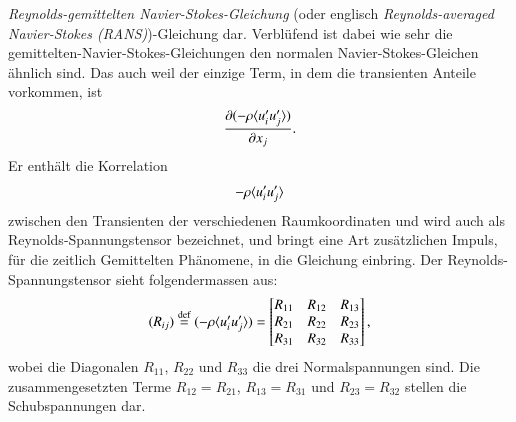 \emph{Reynolds-gemittelten Navier-Stokes-Gleichung} (oder englisch \emph{Reynolds-averaged
Navier-Stokes (RANS)})-Gleichung dar.
Verblüfend ist dabei wie sehr die gemittelten-Navier-Stokes-Gleichungen den normalen Navier-Stokes-Gleichen ähnlich sind.
Das auch weil der einzige Term, in dem die transienten
Anteile vorkommen, ist
%
\begin{equation}
    \frac{\partial(- \rho \ravg{u_i' u_j'})}{\partial x_j}.
\end{equation}
%
Er enthält die Korrelation
%
\[
- \rho \ravg{u_i' u_j'}
\]
%
zwischen den Transienten der verschiedenen Raumkoordinaten und wird auch als Reynolds-Spannungstensor
bezeichnet, und bringt eine Art zusätzlichen Impuls, für die zeitlich Gemittelten Phänomene, in die Gleichung einbring.
Der Reynolds-Spannungstensor sieht folgendermassen aus:
%
\begin{equation}
    (R_{ij}) \overset{\text{def}}{=} (-\rho\ravg{u'_i u'_j}) =
        \begin{bmatrix}
            R_{11} & R_{12} & R_{13} \\
            R_{21} & R_{22} & R_{23} \\
            R_{31} & R_{32} & R_{33}
        \end{bmatrix},
\end{equation}
%
wobei die Diagonalen $R_{11}$, $R_{22}$ und $R_{33}$ die drei Normalspannungen sind.
Die zusammengesetzten Terme $R_{12} = R_{21}$, $R_{13} = R_{31}$ und $R_{23} = R_{32}$ stellen
die Schubspannungen dar.
%
